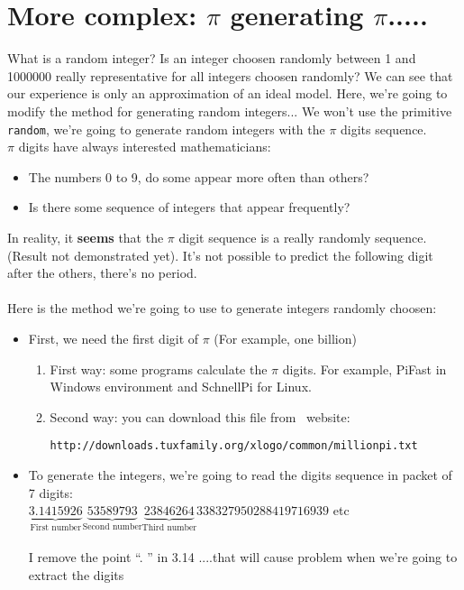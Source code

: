 \section{More complex: $\pi$ generating $\pi$.....}
What is a random integer? Is an integer choosen randomly between 1 and 1000000 really representative for all integers choosen randomly? We can see that our experience is only an approximation of an ideal model. Here, we're going to modify the method for generating random integers... We won't use the primitive \texttt{random}, we're going to generate random integers with the $\pi$ digits sequence.\\
$\pi$ digits have always interested mathematicians:
\begin{itemize}
 \item The numbers 0 to 9, do some appear more often than others?
 \item Is there some sequence of integers that appear frequently?
\end{itemize}
In reality, it \textbf{seems} that the $\pi$ digit sequence is a really randomly sequence. (Result not demonstrated yet). It's not possible to predict the following digit after the others, there's no period.\\ \\
Here is the method we're going to use to generate integers randomly choosen:
\begin{itemize}
 \item First, we need the first digit of $\pi$ (For example, one billion) 
	 \begin{enumerate}
 		\item First way: some programs calculate the $\pi$ digits. For example, PiFast in Windows environment and SchnellPi for Linux.
 		\item Second way: you can download this file from \xlogo\ website: 
		\begin{center}
		\texttt{http://downloads.tuxfamily.org/xlogo/common/millionpi.txt} 
		\end{center}
 	\end{enumerate}
\item To generate the integers, we're going to read the digits sequence in packet of 7 digits:\\
$\underbrace{3.1415926}_{\textrm{First number}}\underbrace{53589793}_{\textrm{Second number}}\underbrace{23846264}_{\textrm{Third number}}338327950288419716939$ etc\\ \\
I remove the point ``. '' in  3.14 ....that will cause problem when we're going to extract the digits
\end{itemize}
